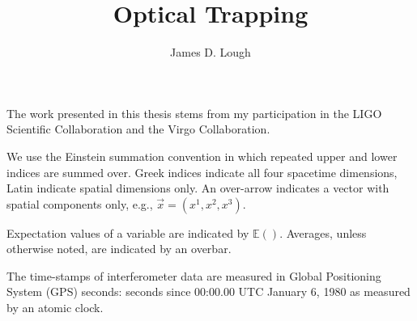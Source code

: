 \documentclass[12pt,notitlepage]{report}
\begin{document}

\title{
Optical Trapping
}
\author{James D. Lough}

\havededicationtrue
\dedication{to\\my little scientists,\\Elizabeth and Henry}
\haveminorfalse
\copyrighttrue
\doctoratetrue
\figurespagetrue
\tablespagetrue
\signedtitlepfalse

\beforepreface {}

The work presented in this thesis stems from my participation in the LIGO
Scientific Collaboration and the Virgo Collaboration.


We use the Einstein summation convention in which repeated upper and lower
indices are summed over. Greek indices indicate all four spacetime dimensions,
Latin indicate spatial dimensions only. An over-arrow indicates a vector with
spatial components only, e.g., $\vec{x} = (x^1,x^2,x^3)$.

\vspace{0.5cm}

\noindent Expectation values of a variable are indicated by $\mathbb{E}()$.
Averages, unless otherwise noted, are indicated by an overbar.

\vspace{0.5cm}

\noindent The time-stamps of interferometer data are measured in
Global Positioning System (GPS) seconds: seconds since 00:00.00 UTC
January 6, 1980 as measured by an atomic clock.



\afterpreface

\listoftodos

%

\label{ch:introduction}


\label{ch:anglenoise}

\end{document}
